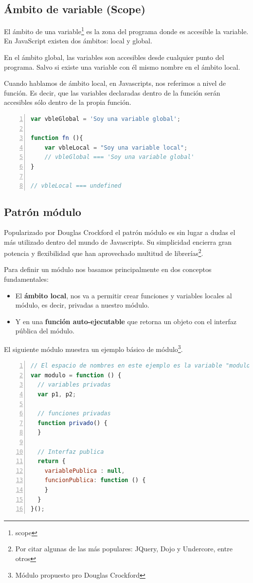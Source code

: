 \subsection{Ámbito de variable (Scope)}

El ámbito de una variable\footnote{scope} es la zona del programa donde es accesible la variable. En JavaScript existen dos ámbitos: local y global.

En el ámbito global, las variables son accesibles desde cualquier punto del programa. Salvo si existe una variable con él mismo nombre en el ámbito local. 

Cuando hablamos de ámbito local, en Javascripts, nos referimos a nivel de función. Es decir, que las variables declaradas dentro de la función serán accesibles sólo dentro de la propia función. 


\begin{lstlisting}[language=JavaScript, numbers=left]
var vbleGlobal = 'Soy una variable global';

function fn (){
	var vbleLocal = "Soy una variable local";
	// vbleGlobal === 'Soy una variable global'
}

// vbleLocal === undefined 
\end{lstlisting}


\subsection{Patrón módulo}
Popularizado por Douglas Crockford el patrón módulo es sin lugar a dudas el más utilizado dentro del mundo de Javascripts. Su simplicidad encierra gran potencia y flexibilidad que han aprovechado multitud de librerías\footnote{Por citar algunas de las más populares: JQuery, Dojo y Undercore, entre otros}.  

Para definir un módulo nos basamos principalmente en dos conceptos fundamentales: 
\begin{itemize}
\item El \textbf{ámbito local}, nos va a permitir crear funciones y variables locales al módulo, es decir, privadas a nuestro módulo. 
\item Y en una \textbf{función auto-ejecutable} que retorna un objeto con el interfaz pública del módulo.
\end{itemize}

El siguiente módulo muestra un ejemplo básico de módulo\footnote{Módulo propuesto pro Douglas Crockford}.

\begin{lstlisting}[language=JavaScript, numbers=left]
// El espacio de nombres en este ejemplo es la variable "modulo"
var modulo = function () {
  // variables privadas
  var p1, p2;
 
  // funciones privadas
  function privado() {
  }
 
  // Interfaz publica
  return {
    variablePublica : null,
    funcionPublica: function () {
    }
  }
}();
\end{lstlisting}


